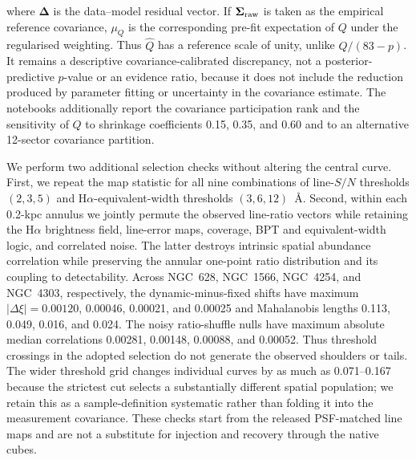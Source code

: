\documentclass[fleqn,usenatbib]{mnras}
\begin{document}
where $\boldsymbol\Delta$ is the data--model residual vector.  If $\boldsymbol\Sigma_{\rm raw}$ is taken as the empirical reference covariance, $\mu_Q$ is the corresponding pre-fit expectation of $Q$ under the regularised weighting.  Thus $\widehat Q$ has a reference scale of unity, unlike $Q/(83-p)$.  It remains a descriptive covariance-calibrated discrepancy, not a posterior-predictive $p$-value or an evidence ratio, because it does not include the reduction produced by parameter fitting or uncertainty in the covariance estimate.  The notebooks additionally report the covariance participation rank and the sensitivity of $Q$ to shrinkage coefficients 0.15, 0.35, and 0.60 and to an alternative 12-sector covariance partition.

We perform two additional selection checks without altering the central curve.  First, we repeat the map statistic for all nine combinations of line-$S/N$ thresholds $(2,3,5)$ and H$\alpha$-equivalent-width thresholds $(3,6,12)$~\AA.  Second, within each 0.2-kpc annulus we jointly permute the observed line-ratio vectors while retaining the H$\alpha$ brightness field, line-error maps, coverage, BPT and equivalent-width logic, and correlated noise.  The latter destroys intrinsic spatial abundance correlation while preserving the annular one-point ratio distribution and its coupling to detectability.  Across NGC~628, NGC~1566, NGC~4254, and NGC~4303, respectively, the dynamic-minus-fixed shifts have maximum $|\Delta\xi|=0.00120$, 0.00046, 0.00021, and 0.00025 and Mahalanobis lengths 0.113, 0.049, 0.016, and 0.024.  The noisy ratio-shuffle nulls have maximum absolute median correlations 0.00281, 0.00148, 0.00088, and 0.00052.  Thus threshold crossings in the adopted selection do not generate the observed shoulders or tails.  The wider threshold grid changes individual curves by as much as 0.071--0.167 because the strictest cut selects a substantially different spatial population; we retain this as a sample-definition systematic rather than folding it into the measurement covariance.  These checks start from the released PSF-matched line maps and are not a substitute for injection and recovery through the native cubes.
\end{document}
